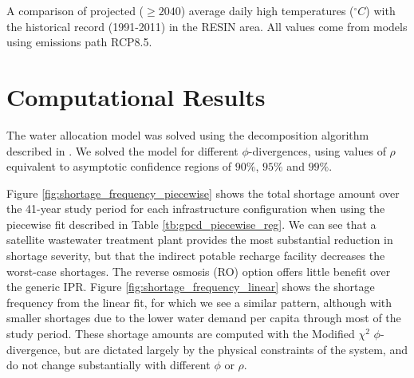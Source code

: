 \documentclass[opre,nonblindrev]{informs3} %
\begin{document}
\begin{table}
	\TABLE
	{
		A comparison of projected ($\geq 2040$) average daily high temperatures ($^\circ C$) with the historical record (1991-2011) in the RESIN area.
		All values come from models using emissions path RCP8.5.
		\label{tb:model_comparison_temperature}
	}
	{}
	{}
\end{table}




\section{Computational Results}
\label{sec:comp}

The water allocation model was solved using the decomposition algorithm described in \cite{love2013phi}.
We solved the model for different $\phi$-divergences, using values of $\rho$ equivalent to asymptotic confidence regions of $90\%$, $95\%$ and $99\%$.

Figure \ref{fig:shortage_frequency_piecewise} shows the total shortage amount over the 41-year study period for each infrastructure configuration when using the piecewise fit described in Table \ref{tb:gpcd_piecewise_reg}.
We can see that a satellite wastewater treatment plant provides the most substantial reduction in shortage severity, but that the indirect potable recharge facility decreases the worst-case shortages.
The reverse osmosis (RO) option offers little benefit over the generic IPR.
Figure \ref{fig:shortage_frequency_linear} shows the shortage frequency from the linear fit, for which we see a similar pattern, although with smaller shortages due to the lower water demand per capita through most of the study period.
These shortage amounts are computed with the Modified $\chi^2$ $\phi$-divergence, but are dictated largely by the physical constraints of the system, and do not change substantially with different $\phi$ or $\rho$.
\end{document}
